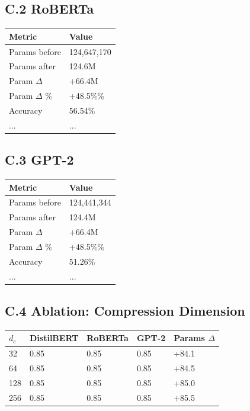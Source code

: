\subsection{C.2 RoBERTa}

\begin{table}[H]
\centering
\small
\begin{tabular}{ll}
\toprule
\textbf{Metric} & \textbf{Value} \\
\midrule
Params before & 124,647,170 \\
Params after & 124.6M \\
Param $\Delta$ & +66.4M \\
Param $\Delta$ \% & +48.5\%\% \\
Accuracy & 56.54\% \\
... & ... \\
\bottomrule
\end{tabular}
\end{table}

\subsection{C.3 GPT-2}

\begin{table}[H]
\centering
\small
\begin{tabular}{ll}
\toprule
\textbf{Metric} & \textbf{Value} \\
\midrule
Params before & 124,441,344 \\
Params after & 124.4M \\
Param $\Delta$ & +66.4M \\
Param $\Delta$ \% & +48.5\%\% \\
Accuracy & 51.26\% \\
... & ... \\
\bottomrule
\end{tabular}
\end{table}

\subsection{C.4 Ablation: Compression Dimension}

\begin{table}[H]
\centering
\small
\begin{tabular}{lllll}
\toprule
\textbf{$d_c$} & \textbf{DistilBERT} & \textbf{RoBERTa} & \textbf{GPT-2} & \textbf{Params $\Delta$} \\
\midrule
32 & 0.85 & 0.85 & 0.85 & +84.1 \\
64 & 0.85 & 0.85 & 0.85 & +84.5 \\
128 & 0.85 & 0.85 & 0.85 & +85.0 \\
256 & 0.85 & 0.85 & 0.85 & +85.5 \\
\bottomrule
\end{tabular}
\end{table}

